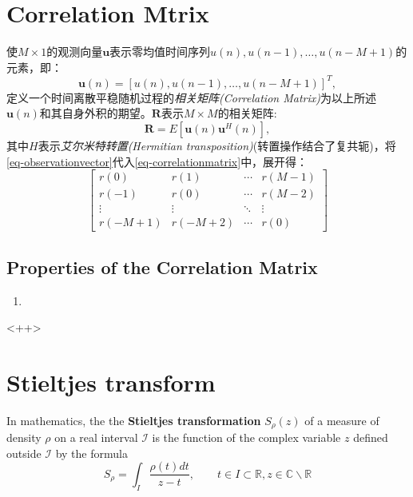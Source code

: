 \section{Correlation Mtrix}
使$M\times 1$的观测向量$\mathbf{u}$表示零均值时间序列$u(n),u(n-1),\dots,u(n-M+1)$的元素，即：
\begin{equation}
    \mathbf{u}(n) = \left[ u(n),u(n-1),\dots,u(n-M+1) \right]^T,
    \label{eq-observationvector}
\end{equation}
定义一个时间离散平稳随机过程的\emph{\textcolor[rgb]{1,0,0}{相关矩阵(Correlation Matrix)}}为以上所述$\mathbf{u}(n)$和其自身外积的期望。$\mathbf{R}$表示$M\times M$的相关矩阵:
\begin{equation}
    \mathbf{R} = E[\mathbf{u}(n)\mathbf{u}^H(n)],
    \label{eq-correlationmatrix}
\end{equation}
其中$H$表示\emph{\textcolor[rgb]{1,0,0}{艾尔米特转置(Hermitian transposition)}}(转置操作结合了复共轭)，将\cref{eq-observationvector}代入\cref{eq-correlationmatrix}中，展开得：
\begin{equation}
    \left[      
        \begin{array}{cccc}
        r(0) & r(1) & \cdots & r(M-1)\\
        r(-1) & r(0) & \cdots & r(M-2)\\
        \vdots & \vdots & \ddots & \vdots\\
        r(-M+1) & r(-M+2) & \cdots & r(0)
    \end{array}
    \right]
    \label{eq-correlationmatrixexpanded}
\end{equation}
\subsection{Properties of the Correlation Matrix}
\begin{enumerate}
    \item 
\end{enumerate}<++>

\section{Stieltjes transform}
In mathematics, the the \textbf{\textcolor[rgb]{1,0,0}{Stieltjes transformation}} $S_{\rho}(z)$ of a measure of density $\rho$ on a real interval $\mathcal{I}$ is the function of the complex variable $z$ defined outside $\mathcal{I}$ by the formula
\begin{equation}
    S_{\rho} = \int_I \dfrac{\rho(t) dt}{z-t}, \qquad t \in I \subset \mathbb{R}, z\in \mathbb{C} \backslash \mathbb{R}
    \label{eq-Stieltjes}
\end{equation}

